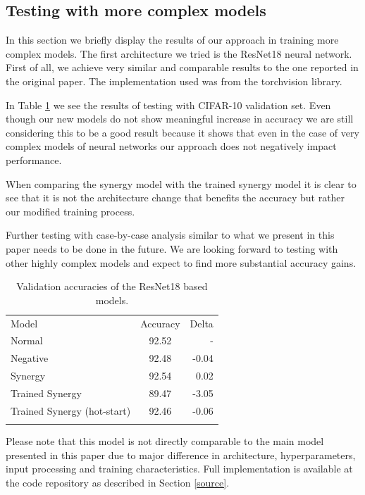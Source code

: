 \documentclass[b5paper]{book}
\let\cite\parencite
\begin{document}
\subsection{Testing with more complex models}
\label{resnet}

In this section we briefly display the results of our approach in training more complex models. The first architecture we tried is the ResNet18 \cite{he2016deep} neural network. First of all, we achieve very similar and comparable results to the one reported in the original paper. The implementation used was from the torchvision \cite{torchvision} library.

In Table \ref{tab:7} we see the results of testing with CIFAR-10 validation set. Even though our new models do not show meaningful increase in accuracy we are still considering this to be a good result because it shows that even in the case of very complex models of neural networks our approach does not negatively impact performance. 

When comparing the synergy model with the trained synergy model it is clear to see that it is not the architecture change that benefits the accuracy but rather our modified training process. 

Further testing with case-by-case analysis similar to what we present in this paper needs to be done in the future. We are looking forward to testing with other highly complex models and expect to find more substantial accuracy gains.

\begin{table}
\centering
\caption{Validation accuracies of the ResNet18 based models.}
\label{tab:7}
\begin{tabular}{lcr}
\hline\noalign{\smallskip}
Model & Accuracy & Delta\\
\noalign{\smallskip}\hline\noalign{\smallskip}
Normal & 92.52 & - \\
Negative & 92.48 & -0.04 \\
Synergy & 92.54 & 0.02 \\
Trained Synergy & 89.47 & -3.05 \\
Trained Synergy (hot-start) & 92.46 & -0.06 \\
\noalign{\smallskip}\hline
\end{tabular}
\end{table}

Please note that this model is not directly comparable to the main model presented in this paper due to major difference in architecture, hyperparameters, input processing and training characteristics. Full implementation is available at the code repository as described in Section \ref{source}.
\end{document}
